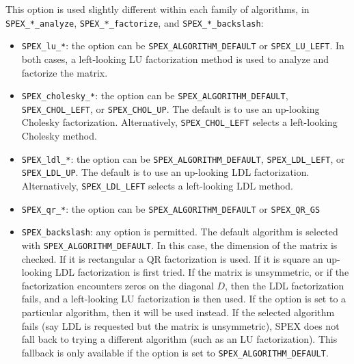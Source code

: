 \documentclass[12pt,oneside]{book}
\theoremstyle{definition}
\begin{document}
This option is used slightly different within each family of algorithms, in \verb'SPEX_*_analyze', \verb'SPEX_*_factorize', and \verb'SPEX_*_backslash':

\begin{itemize}

\item \verb'SPEX_lu_*':  the option can be
    \verb'SPEX_ALGORITHM_DEFAULT' or \verb'SPEX_LU_LEFT'.
    In both cases, a left-looking LU factorization method
    is used to analyze and factorize the matrix.

\item \verb'SPEX_cholesky_*':  the option can be 
\verb'SPEX_ALGORITHM_DEFAULT', \verb'SPEX_CHOL_LEFT',
or \verb'SPEX_CHOL_UP'.  The default is to use
an up-looking Cholesky factorization.  Alternatively,
\verb'SPEX_CHOL_LEFT' selects a left-looking Cholesky method.

\item \verb'SPEX_ldl_*':  the option can be 
\verb'SPEX_ALGORITHM_DEFAULT', \verb'SPEX_LDL_LEFT',
or \verb'SPEX_LDL_UP'.  The default is to use
an up-looking LDL factorization.  Alternatively,
\verb'SPEX_LDL_LEFT' selects a left-looking LDL method.

\item \verb|SPEX_qr_*|: the option can be \verb|SPEX_ALGORITHM_DEFAULT|
or \verb|SPEX_QR_GS|

\item \verb'SPEX_backslash':  any option is permitted.
The default algorithm is selected with 
\verb'SPEX_ALGORITHM_DEFAULT'.  In this case, the dimension
of the matrix is checked. If it is rectangular a QR factorization
is used. If it is square an up-looking
LDL factorization is first tried.  If the matrix is unsymmetric,
or if the factorization encounters zeros on the diagonal $D$, then the LDL factorization fails, and a left-looking LU factorization is then used.
If the option is set to a particular algorithm, then it will be used instead.  If the selected algorithm fails (say LDL is requested but the matrix is unsymmetric), SPEX does not fall back to trying a different algorithm (such as an LU factorization).  This fallback is only available if the
option is set to \verb'SPEX_ALGORITHM_DEFAULT'.

\end{itemize}

\end{document}
